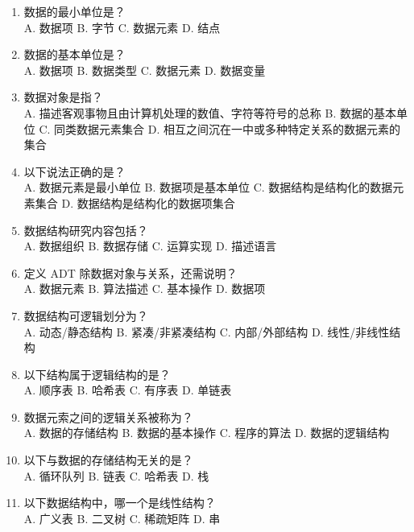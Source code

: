 \documentclass[lang=cn,newtx,10pt,scheme=chinese]{../../elegantbook}
\begin{document}
\begin{enumerate}
    \item 数据的最小单位是？\\
    A. 数据项 \quad B. 字节 \quad C. 数据元素 \quad D. 结点

    \item 数据的基本单位是？\\
    A. 数据项 \quad B. 数据类型 \quad C. 数据元素 \quad D. 数据变量

    \item 数据对象是指？\\
    A. 描述客观事物且由计算机处理的数值、字符等符号的总称 \quad 
    B. 数据的基本单位
    C. 同类数据元素集合
    D. 相互之间沉在一中或多种特定关系的数据元素的集合

    \item 以下说法正确的是？\\
    A. 数据元素是最小单位 \quad B. 数据项是基本单位
    \quad C. 数据结构是结构化的数据元素集合 \quad D. 数据结构是结构化的数据项集合

    \item 数据结构研究内容包括？\\
    A. 数据组织 \quad B. 数据存储 \quad C. 运算实现 \quad D. 描述语言

    \item 定义 ADT 除数据对象与关系，还需说明？\\
    A. 数据元素 \quad B. 算法描述 \quad C. 基本操作 \quad D. 数据项

    \item 数据结构可逻辑划分为？\\
    A. 动态/静态结构 \quad B. 紧凑/非紧凑结构
    \quad C. 内部/外部结构 \quad D. 线性/非线性结构

    \item 以下结构属于逻辑结构的是？\\
    A. 顺序表 \quad B. 哈希表 \quad C. 有序表 \quad D. 单链表

    \item 数据元索之间的逻辑关系被称为？\\
    A. 数据的存储结构 \quad B. 数据的基本操作 \quad C. 程序的算法 \quad D. 数据的逻辑结构

    \item 以下与数据的存储结构无关的是？\\
    A. 循环队列 \quad B. 链表 \quad C. 哈希表 \quad D. 栈

    \item 以下数据结构中，哪一个是线性结构？\\
    A. 广义表 \quad B. 二叉树 \quad C. 稀疏矩阵 \quad D. 串


\end{enumerate}
\end{document}
